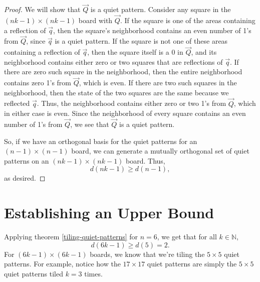 \documentclass[a4paper]{article}
\newcommand{\N}{\mathbb{N}}
\begin{document}
\begin{proof}
		We will show that $\vec{Q}$ is a quiet pattern.
		Consider any square in the $(nk-1) \times (nk-1)$ board with $\vec{Q}$.
		If the square is one of the areas containing a reflection of $\vec{q}$, then the square's neighborhood contains an even number of 1's from $\vec{Q}$, since $\vec{q}$ is a quiet pattern.
		If the square is not one of these areas containing a reflection of $\vec{q}$, then the square itself is a 0 in $\vec{Q}$, and its neighborhood contains either zero or two squares that are reflections of $\vec{q}$.
		If there are zero such square in the neighborhood, then the entire neighborhood contains zero 1's from $\vec{Q}$, which is even.
		If there are two such squares in the neighborhood, then the state of the two squares are the same because we reflected $\vec{q}$.
		Thus, the neighborhood contains either zero or two 1's from $\vec{Q}$, which in either case is even.
		Since the neighborhood of every square contains an even number of 1's from $\vec{Q}$, we see that $\vec{Q}$ is a quiet pattern.
		
		So, if we have an orthogonal basis for the quiet patterns for an $(n-1) \times (n-1)$ board, we can generate a mutually orthogonal set of quiet patterns on an $(nk-1) \times (nk-1)$ board. 
		Thus,
		\begin{equation*}
			d(nk-1) \geq d(n-1),
		\end{equation*}
		as desired.
	\end{proof}

	\section{Establishing an Upper Bound}
	Applying theorem \ref{tiling-quiet-patterns} for $n=6$, we get that for all $k \in \N$,
	\begin{equation*}
		d(6k - 1) \geq d(5) = 2.
	\end{equation*}
	For $(6k-1) \times (6k-1)$ boards, we know that we're tiling the $5 \times5 $ quiet patterns.
	For example, notice how the $17 \times 17$ quiet patterns are simply the $5 \times 5$ quiet patterns tiled $k=3$ times.
	
\end{document}
